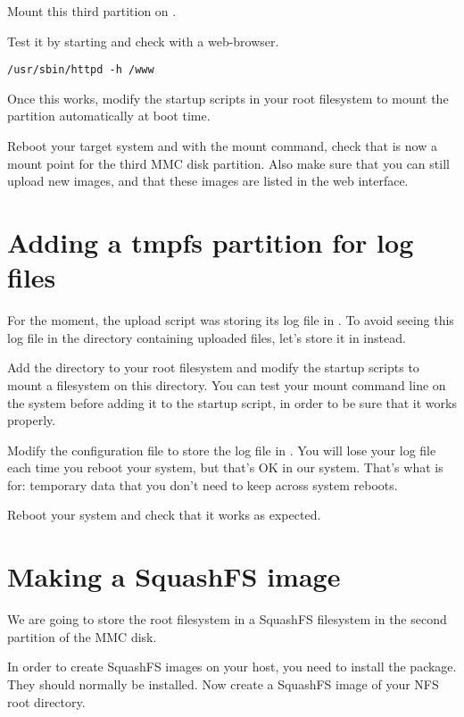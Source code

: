Mount this third partition on .

Test it by starting  and check with a web-browser.

\begin{verbatim}
/usr/sbin/httpd -h /www
\end{verbatim}

Once this works, modify the startup scripts in your root filesystem
to mount the partition automatically at boot time.

Reboot your target system and with the mount command, check that
 is now a mount point for the third MMC disk
partition. Also make sure that you can still upload new images, and
that these images are listed in the web interface.

\section{Adding a tmpfs partition for log files}

For the moment, the upload script was storing its log file in
. To avoid seeing this log file in
the directory containing uploaded files, let's store it in
 instead.

Add the  directory to your root filesystem and modify
the startup scripts to mount a  filesystem on this
directory. You can test your  mount command line on the
system before adding it to the startup script, in order to be sure
that it works properly.

Modify the  configuration file to store
the log file in . You will lose your log
file each time you reboot your system, but that's OK in our
system. That's what  is for: temporary data that you don't need
to keep across system reboots.

Reboot your system and check that it works as expected.

\section{Making a SquashFS image}

We are going to store the root filesystem in a SquashFS filesystem in
the second partition of the MMC disk.

In order to create SquashFS images on your host, you need to install
the  package. They should normally be installed.
Now create a SquashFS image of your NFS root directory.

